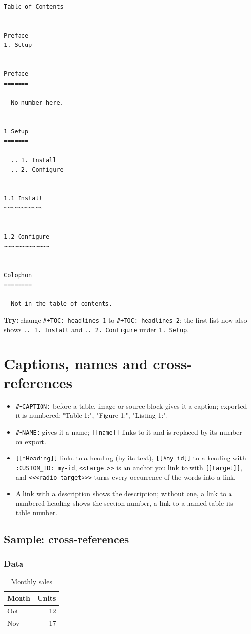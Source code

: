 \begin{verbatim}
Table of Contents
_________________

Preface
1. Setup


Preface
=======

  No number here.


1 Setup
=======

  .. 1. Install
  .. 2. Configure


1.1 Install
~~~~~~~~~~~


1.2 Configure
~~~~~~~~~~~~~


Colophon
========

  Not in the table of contents.
\end{verbatim}

\textbf{Try:} change \texttt{\#+TOC: headlines 1} to \texttt{\#+TOC: headlines 2}: the first list
now also shows \texttt{.. 1. Install} and \texttt{.. 2. Configure} under \texttt{1. Setup}.
\section{Captions, names and cross-references}
\label{sec:orgc1855ad}
\begin{itemize}
\item \texttt{\#+CAPTION:} before a table, image or source block gives it a caption;
exported it is numbered: "Table 1:", "Figure 1:", "Listing 1:".
\item \texttt{\#+NAME:} gives it a name; \texttt{[[name]]} links to it and is replaced by its
number on export.
\item \texttt{[[*Heading]]} links to a heading (by its text), \texttt{[[\#my-id]]} to a
heading with \texttt{:CUSTOM\_ID: my-id}, \texttt{<{}<{}target>{}>{}} is an anchor you link to
with \texttt{[[target]]}, and \texttt{<{}<{}<radio target>{}>{}>} turns every occurrence of
the words into a link.
\item A link with a description shows the description; without one, a link to
a numbered heading shows the section number, a link to a named table
its table number.
\end{itemize}
\subsection{Sample: cross-references}
\label{sec:org6669e35}
\subsubsection{Data}
\label{sec:org6f030dd}
\begin{table}[htbp]
\caption{\label{tab:org00fb7c1}Monthly sales}
\centering
\begin{tabular}{lr}
Month & Units\\
\hline
Oct & 12\\
Nov & 17\\
\end{tabular}
\end{table}

